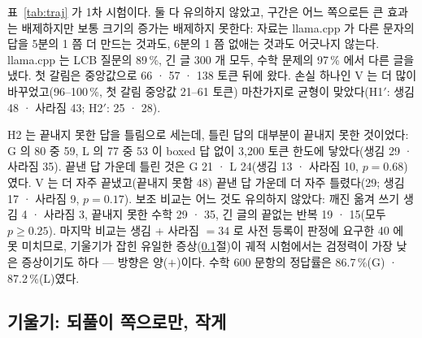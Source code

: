 \documentclass[11pt]{article}
\begin{document}
표~\ref{tab:traj} 가 1차 시험이다. 둘 다 유의하지 않았고, 구간은 어느 쪽으로든 큰 효과는 배제하지만 보통 크기의 증가는 배제하지
못한다: 자료는 llama.cpp 가 다른 문자의 답을 5분의 1 쯤 더 만드는 것과도, 6분의 1 쯤 없애는 것과도 어긋나지 않는다. llama.cpp 는
LCB 질문의 89\,\%, 긴 글 300 개 모두, 수학 문제의 97\,\% 에서 다른 글을 냈다. 첫 갈림은 중앙값으로 66 · 57 · 138 토큰 뒤에 왔다.
손실 하나인 V 는 더 많이 바꾸었고(96--100\,\%, 첫 갈림 중앙값 21--61 토큰) 마찬가지로 균형이 맞았다(H1$'$: 생김 48 · 사라짐 43;
H2$'$: 25 · 28).

H2 는 끝내지 못한 답을 틀림으로 세는데, 틀린 답의 대부분이 끝내지 못한 것이었다: G 의 80 중 59, L 의 77 중 53 이 boxed 답 없이
3,200 토큰 한도에 닿았다(생김 29 · 사라짐 35). 끝낸 답 가운데 틀린 것은 G 21 · L 24(생김 13 · 사라짐 10, $p=0.68$)였다. V 는 더
자주 끝냈고(끝내지 못함 48) 끝낸 답 가운데 더 자주 틀렸다(29; 생김 17 · 사라짐 9, $p=0.17$). 보조 비교는 어느 것도 유의하지
않았다: 깨진 옮겨 쓰기 생김 4 · 사라짐 3, 끝내지 못한 수학 29 · 35, 긴 글의 끝없는 반복 19 · 15(모두 $p\ge 0.25$). 마지막 비교는
생김 + 사라짐 $=34$ 로 사전 등록이 판정에 요구한 40 에 못 미치므로, 기울기가 잡힌 유일한 증상(\ref{sec:tilt-results}절)이 궤적
시험에서는 검정력이 가장 낮은 증상이기도 하다 --- 방향은 양($+$)이다. 수학 600 문항의 정답률은 86.7\,\%(G) · 87.2\,\%(L)였다.

\subsection{기울기: 되풀이 쪽으로만, 작게}\label{sec:tilt-results}
\end{document}
